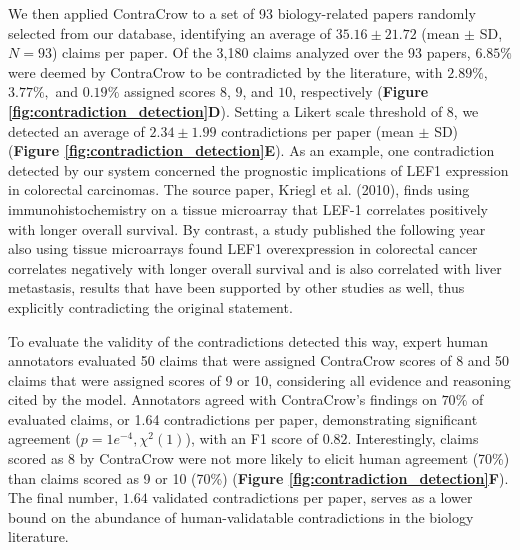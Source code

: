 \documentclass{article}
\begin{document}
\begin{bibunit}[unsrt]
We then applied ContraCrow to a set of 93 biology-related papers randomly selected from our database, identifying an average of $35.16 \pm 21.72$ (mean $\pm$ SD, $N=93$) claims per paper. Of the 3,180 claims analyzed over the 93 papers, $6.85\%$ were deemed by ContraCrow to be contradicted by the literature, with $2.89\%$, $3.77\%,$ and $0.19\%$ assigned scores $8$, $9$, and $10$, respectively (\textbf{Figure \ref{fig:contradiction_detection}D}). Setting a Likert scale threshold of $8$, we detected an average of $2.34 \pm 1.99$ contradictions per paper (mean $\pm$ SD) (\textbf{Figure \ref{fig:contradiction_detection}E}). As an example, one contradiction detected by our system concerned the prognostic implications of LEF1 expression in colorectal carcinomas. The source paper, Kriegl et al. (2010)\cite{kriegl2010lef}, finds using immunohistochemistry on a tissue microarray that LEF-1 correlates positively with longer overall survival. By contrast, a study published the following year also using tissue microarrays found LEF1 overexpression in colorectal cancer correlates negatively with longer overall survival and is also correlated with liver metastasis\cite{lin2011comparative}, results that have been supported by other studies as well\cite{wang2013increased,wang2013knockdown,kermanshahi2014lef}, thus explicitly contradicting the original statement.

To evaluate the validity of the contradictions detected this way, expert human annotators evaluated 50 claims that were assigned ContraCrow scores of 8 and 50 claims that were assigned scores of 9 or 10, considering all evidence and reasoning cited by the model. Annotators agreed with ContraCrow's findings on $70\%$ of evaluated claims, or 1.64 contradictions per paper, demonstrating significant agreement ($p = 1e^{-4}, \chi^2(1)$), with an F1 score of $0.82$. Interestingly, claims scored as 8 by ContraCrow were not more likely to elicit human agreement (70\%) than claims scored as 9 or 10 (70\%) (\textbf{Figure \ref{fig:contradiction_detection}F}). The final number, $1.64$ validated contradictions per paper, serves as a lower bound on the abundance of human-validatable contradictions in the biology literature.


\end{bibunit}
\end{document}
